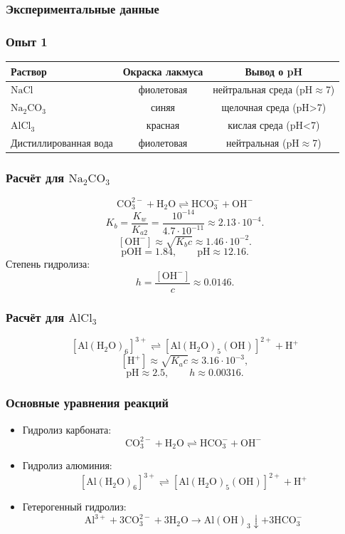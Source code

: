 \documentclass[a4paper,12pt]{article}
\begin{document}
	
	\subsubsection*{Экспериментальные данные}
	\subsubsection*{Опыт 1}
	\begin{table}[h]
		\centering
		\begin{tabular}{lcc}
			\toprule
			Раствор & Окраска лакмуса & Вывод о pH \\
			\midrule
			$\mathrm{NaCl}$ & фиолетовая & нейтральная среда (pH$\approx$7) \\
			$\mathrm{Na_2CO_3}$ & синяя & щелочная среда (pH>7) \\
			$\mathrm{AlCl_3}$ & красная & кислая среда (pH<7) \\
			Дистиллированная вода & фиолетовая & нейтральная (pH$\approx$7) \\
			\bottomrule
		\end{tabular}
	\end{table}
	
	\subsubsection*{Расчёт для $\mathrm{Na_2CO_3}$}
	\[
	\mathrm{CO_3^{2-}+H_2O \rightleftharpoons HCO_3^-+OH^-}
	\]
	\[
	K_b=\frac{K_w}{K_{a2}}=\frac{10^{-14}}{4.7\cdot10^{-11}}\approx 2.13\cdot10^{-4}.
	\]
	\[
	[\mathrm{OH^-}] \approx \sqrt{K_b c}\approx 1.46\cdot10^{-2}.
	\]
	\[
	\mathrm{pOH}=1.84,\qquad \mathrm{pH}\approx 12.16.
	\]
	Степень гидролиза:
	\[
	h=\frac{[\mathrm{OH^-}]}{c}\approx 0.0146.
	\]
	
	\subsubsection*{Расчёт для $\mathrm{AlCl_3}$}
	\[
	\mathrm{[Al(H_2O)_6]^{3+} \rightleftharpoons [Al(H_2O)_5(OH)]^{2+}+H^+}
	\]
	\[
	[\mathrm{H^+}] \approx \sqrt{K_a c}\approx 3.16\cdot10^{-3},
	\]
	\[
	\mathrm{pH}\approx 2.5,
	\qquad h\approx 0.00316.
	\]
	
	\subsubsection*{Основные уравнения реакций}
	\begin{itemize}
		\item Гидролиз карбоната:
		\[
		\mathrm{CO_3^{2-}+H_2O \rightleftharpoons HCO_3^- + OH^-}
		\]
		\item Гидролиз алюминия:
		\[
		\mathrm{[Al(H_2O)_6]^{3+} \rightleftharpoons [Al(H_2O)_5(OH)]^{2+}+H^+}
		\]
		\item Гетерогенный гидролиз:
		\[
		\mathrm{Al^{3+}+3CO_3^{2-}+3H_2O \to Al(OH)_3 \downarrow +3HCO_3^-}
		\]
	\end{itemize}
	
\end{document}
